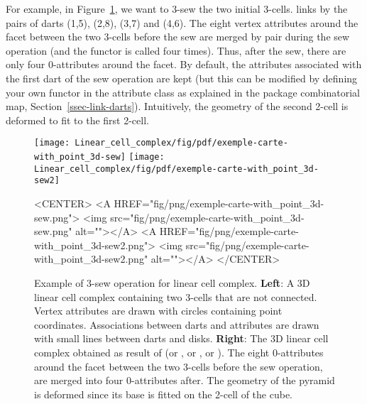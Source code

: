 For example, in Figure~\ref{fig-lcc-exemple-sew}, we want to 3-sew the
two initial 3-cells.  links by \betatrois{} the pairs
of darts (1,5), (2,8), (3,7) and (4,6). The eight vertex attributes
around the facet between the two 3-cells before the sew are merged by
pair during the sew operation (and the  functor is
called four times). Thus, after the sew, there are only four
0-attributes around the facet. By default, the attributes associated
with the first dart of the sew operation are kept (but this can be
modified by defining your own functor in the attribute class as
explained in the package combinatorial map, Section~\ref{ssec-link-darts}). 
Intuitively, the
geometry of the second 2-cell is deformed to fit to the first 2-cell.
%
\def\LargFig{.45\textwidth}
\begin{figure}
  \begin{ccTexOnly}
    \begin{center}
      \texttt{[image: Linear\_cell\_complex/fig/pdf/exemple-carte-with\_point\_3d-sew]}\qquad
      \texttt{[image: Linear\_cell\_complex/fig/pdf/exemple-carte-with\_point\_3d-sew2]}
    \end{center}
  \end{ccTexOnly}
  \begin{ccHtmlOnly}
    <CENTER>
    <A HREF="fig/png/exemple-carte-with_point_3d-sew.png">
        <img src="fig/png/exemple-carte-with_point_3d-sew.png" alt=""></A>
    <A HREF="fig/png/exemple-carte-with_point_3d-sew2.png">
        <img src="fig/png/exemple-carte-with_point_3d-sew2.png" alt=""></A>
    </CENTER>
    \end{ccHtmlOnly}
    \caption{Example of 3-sew operation for linear cell complex.
      \textbf{Left}: A 3D linear cell complex containing two 3-cells
      that are not connected. Vertex attributes are drawn with circles
      containing point coordinates.  Associations between darts and
      attributes are drawn with small lines between darts and
      disks. \textbf{Right}: The 3D linear cell complex obtained as
      result of  (or , or
      , or ).  The eight
      0-attributes around the facet between the two 3-cells before the
      sew operation, are merged into four 0-attributes after. The
      geometry of the pyramid is deformed since its base is fitted on
      the 2-cell of the cube.}
    \label{fig-lcc-exemple-sew}
\end{figure} 

